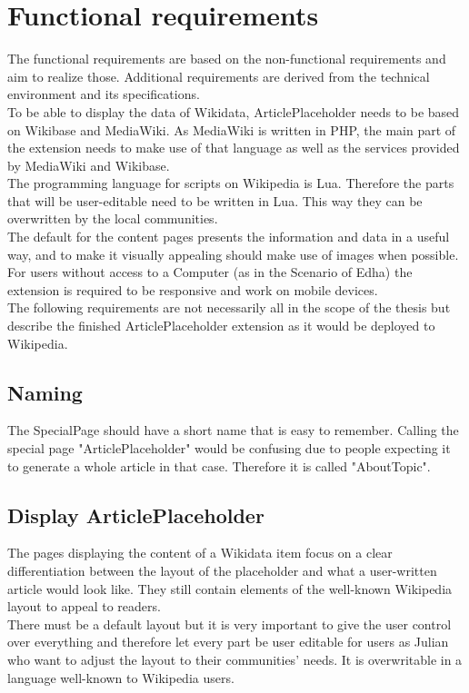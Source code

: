 \chapter {Functional requirements}

The functional requirements are based on the non-functional requirements and aim to realize those. Additional requirements are derived from the technical environment and its specifications. \\
To be able to display the data of Wikidata, ArticlePlaceholder needs to be based on Wikibase and MediaWiki.
As MediaWiki is written in PHP, the main part of the extension needs to make use of that language as well as the services provided by MediaWiki and Wikibase. \\
The programming language for scripts on Wikipedia is Lua. Therefore the parts that will be user-editable need to be written in Lua. This way they can be overwritten by the local communities. \\
The default for the content pages presents the information and data in a useful way, and to make it visually appealing should make use of images when possible.
For users without access to a Computer (as in the Scenario of Edha) the extension is required to be responsive and work on mobile devices. \\
The following requirements are not necessarily all in the scope of the thesis but describe the finished ArticlePlaceholder extension as it would be deployed to Wikipedia.

\section{Naming}
The SpecialPage should have a short name that is easy to remember. Calling the special page "ArticlePlaceholder" would be confusing due to people expecting it to generate a whole article in that case. Therefore it is called "AboutTopic". 

\section{Display ArticlePlaceholder}
The pages displaying the content of a Wikidata item focus on a clear differentiation between the layout of the placeholder and what a user-written article would look like. They still contain elements of the well-known Wikipedia layout to appeal to readers. \\
There must be a default layout but it is very important to give the user control over everything and therefore let every part be user editable for users as Julian who want to adjust the layout to their communities' needs. It is overwritable in a language well-known to Wikipedia users.

